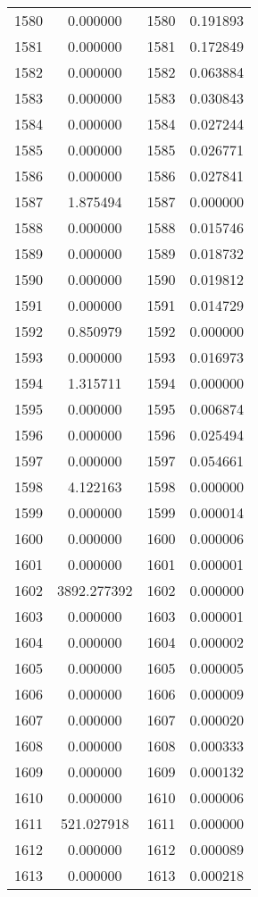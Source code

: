 \documentclass[12pt]{article}
\begin{document}
\begin{longtable}{@{}cccc@{}}
1580 & 0.000000 & 1580 & 0.191893 \\
1581 & 0.000000 & 1581 & 0.172849 \\
1582 & 0.000000 & 1582 & 0.063884 \\
1583 & 0.000000 & 1583 & 0.030843 \\
1584 & 0.000000 & 1584 & 0.027244 \\
1585 & 0.000000 & 1585 & 0.026771 \\
1586 & 0.000000 & 1586 & 0.027841 \\
1587 & 1.875494 & 1587 & 0.000000 \\
1588 & 0.000000 & 1588 & 0.015746 \\
1589 & 0.000000 & 1589 & 0.018732 \\
1590 & 0.000000 & 1590 & 0.019812 \\
1591 & 0.000000 & 1591 & 0.014729 \\
1592 & 0.850979 & 1592 & 0.000000 \\
1593 & 0.000000 & 1593 & 0.016973 \\
1594 & 1.315711 & 1594 & 0.000000 \\
1595 & 0.000000 & 1595 & 0.006874 \\
1596 & 0.000000 & 1596 & 0.025494 \\
1597 & 0.000000 & 1597 & 0.054661 \\
1598 & 4.122163 & 1598 & 0.000000 \\
1599 & 0.000000 & 1599 & 0.000014 \\
1600 & 0.000000 & 1600 & 0.000006 \\
1601 & 0.000000 & 1601 & 0.000001 \\
1602 & 3892.277392 & 1602 & 0.000000 \\
1603 & 0.000000 & 1603 & 0.000001 \\
1604 & 0.000000 & 1604 & 0.000002 \\
1605 & 0.000000 & 1605 & 0.000005 \\
1606 & 0.000000 & 1606 & 0.000009 \\
1607 & 0.000000 & 1607 & 0.000020 \\
1608 & 0.000000 & 1608 & 0.000333 \\
1609 & 0.000000 & 1609 & 0.000132 \\
1610 & 0.000000 & 1610 & 0.000006 \\
1611 & 521.027918 & 1611 & 0.000000 \\
1612 & 0.000000 & 1612 & 0.000089 \\
1613 & 0.000000 & 1613 & 0.000218 \\

\end{longtable}
\end{document}
